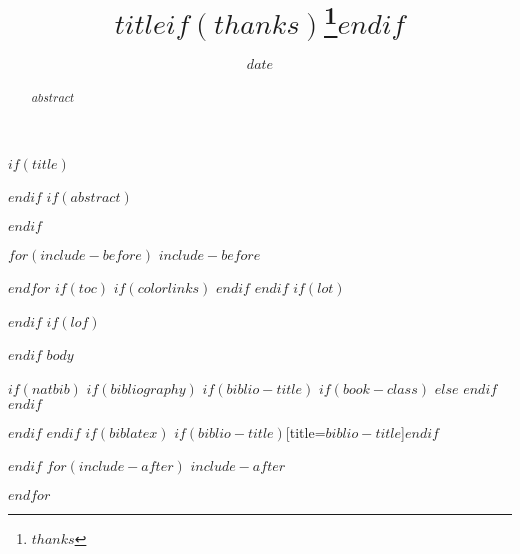 \documentclass[$if(fontsize)$$fontsize$,$endif$$if(lang)$$babel-lang$,$endif$$if(papersize)$$papersize$paper,$endif$$for(classoption)$$classoption$$sep$,$endfor$]{$documentclass$}
\title{$title$$if(thanks)$\thanks{$thanks$}$endif$}
\date{$date$}
\begin{document}
\pagestyle{front}
$if(title)$
\maketitle
\thispagestyle{front}
$endif$
$if(abstract)$
\begin{abstract}
$abstract$
\end{abstract}
$endif$
\clearpage
\pagestyle{main}

$for(include-before)$
$include-before$

$endfor$
$if(toc)$
{
$if(colorlinks)$
\hypersetup{linkcolor=$if(toccolor)$$toccolor$$else$black$endif$}
$endif$
\setcounter{tocdepth}{$toc-depth$}
\tableofcontents
}
$endif$
$if(lot)$
\listoftables
$endif$
$if(lof)$
\listoffigures
$endif$
$body$

$if(natbib)$
$if(bibliography)$
$if(biblio-title)$
$if(book-class)$
\renewcommand\bibname{$biblio-title$}
$else$
\renewcommand\refname{$biblio-title$}
$endif$
$endif$
{\small
}

$endif$
$endif$
$if(biblatex)$
\printbibliography$if(biblio-title)$[title=$biblio-title$]$endif$

$endif$
$for(include-after)$
$include-after$

$endfor$
\end{document}
